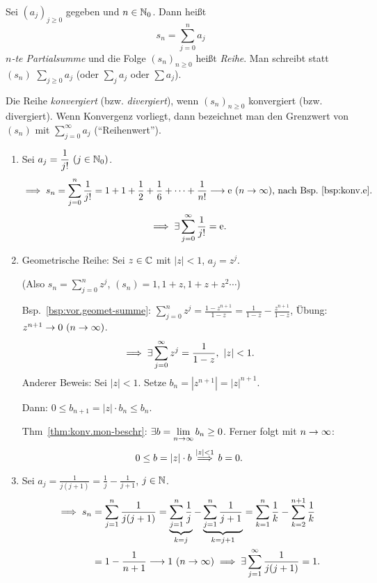 \documentclass[12pt]{scrreprt}
\begin{document}
\begin{dfn}
  \label{dfn:reihen.reihe}
  Sei $(a_j)_{j\geq 0}$ gegeben und $n\in\mathbb{N}_0$. Dann heißt
  \[s_n = \sum^n_{j=0}a_j\]
  \emph{$n$-te Partialsumme} und die Folge $(s_n)_{n\geq 0}$ heißt \emph{Reihe}. Man schreibt statt $(s_n)$ $\sum_{j\geq 0}a_j$ (oder $\sum_j a_j$ oder $\sum a_j$).
  
  Die Reihe \emph{konvergiert} (bzw. \emph{divergiert}), wenn $(s_n)_{n\geq 0}$ konvergiert (bzw. divergiert). Wenn Konvergenz vorliegt, dann bezeichnet man den Grenzwert von $(s_n)$ mit $\displaystyle\sum_{j=0}^\infty a_j$ ("`Reihenwert"').
\end{dfn}

\begin{bsp}
  \label{bsp:reihen.reihe}
  \begin{enumerate}%
  \item Sei $\displaystyle a_j = \frac{1}{j!}\ (j\in\set{N}_0)$.
  \[\implies s_n = \sum^n_{j=0}\frac{1}{j!} = 1 + 1+\frac{1}{2}+\frac{1}{6}+\dotsb+\frac{1}{n!} \longrightarrow \mathrm{e}\ (n\rightarrow\infty)\text{, nach Bsp.~\ref{bsp:konv.e}.}\]
  \[\implies\exists\sum^\infty_{j=0}\frac{1}{j!} = \mathrm{e}.\]
  
  \item Geometrische Reihe: Sei $z\in\mathbb{C}$ mit $|z|<1$, $a_j=z^j$.
  
  (Also $\displaystyle s_n = \sum^n_{j=0}z^j$, $(s_n) = 1, 1+z, 1+z+z^2\dotsb$)
  
  Bsp.~\ref{bsp:vor.geomet-summe}: $\displaystyle\sum^n_{j=0}z^j= \frac{1-z^{n+1}}{1-z}=\frac{1}{1-z}-\frac{z^{n+1}}{1-z}$, Übung: $z^{n+1}\rightarrow 0\ (n\rightarrow\infty)$.
  \[\folgt\exists\sum^\infty_{j=0}z^j=\frac{1}{1-z},\ |z|<1.\]
  Anderer Beweis: Sei $|z|<1$. Setze $b_n=|z^{n+1}|=|z|^{n+1}$.
  
  Dann: $0\leq b_{n+1}=|z|\cdot b_n\leq b_n$.
  
  Thm~\ref{thm:konv.mon-beschr}: $\exists b=\displaystyle\lim_{n\rightarrow\infty}b_n\geq 0$. Ferner folgt mit $n\rightarrow\infty$:
  \[0\leq b = |z|\cdot b \stackrel{|z|<1}{\implies} b = 0.\]
  
  \item Sei $\displaystyle a_j = \frac{1}{j(j+1)} = \frac{1}{j}-\frac{1}{j+1}$, $j\in\mathbb{N}$.
  \begin{align*}\folgt s_n&=\sum^n_{j=1}\frac{1}{j(j+1)} = \underbrace{\sum^n_{j=1}\frac{1}{j}}_{k=j} - \underbrace{\sum^n_{j=1}\frac{1}{j+1}}_{k=j+1} = \sum^n_{k=1}\frac{1}{k} - \sum^{n+1}_{k=2}\frac{1}{k}\\
  &= 1 - \frac{1}{n+1}\lra 1\ (\ninf)\folgt\exists\sum^\infty_{j=1}\frac{1}{j(j+1)}=1.\end{align*}
  

\end{enumerate}
\end{bsp}
\end{document}
